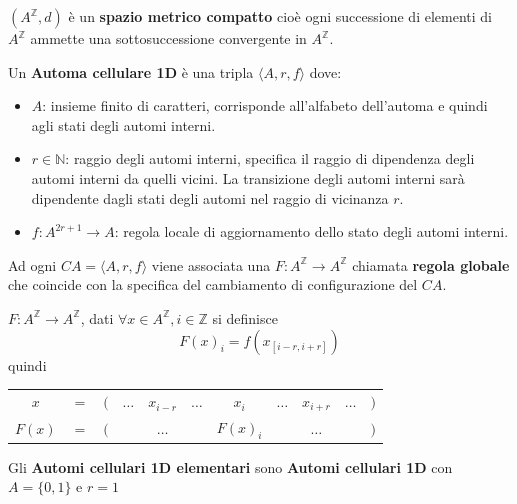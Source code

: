 \begin{nota} 
    $(A^\mathbb{Z}, d)$ è un \textbf{spazio metrico compatto} cioè ogni successione
    di elementi di $A^\mathbb{Z}$ ammette una sottosuccessione convergente in $A^\mathbb{Z}$.
\end{nota}
\begin{definizione} 
    Un \textbf{Automa cellulare 1D}  è una tripla $\langle A, r, f\rangle$
    dove:
    \begin{itemize}
        \item $A$: insieme finito di caratteri, corrisponde all'alfabeto dell'automa e
              quindi agli stati degli automi interni.
        \item $r\in \mathbb{N}$: raggio degli automi interni, specifica il raggio
              di dipendenza degli automi interni da quelli vicini. La transizione degli
              automi interni sarà dipendente dagli stati degli automi nel raggio
              di vicinanza $r$.
        \item $f: A^{2r+1}\rightarrow A$: regola locale di aggiornamento dello
              stato degli automi interni.
    \end{itemize}
\end{definizione}
Ad ogni $CA = \langle A, r, f\rangle$ viene associata una $F:A^\mathbb{Z}\rightarrow A^\mathbb{Z}$
chiamata \textbf{regola globale} che coincide con la specifica del cambiamento
di configurazione del $CA$.
\begin{definizione} 
    $F:A^\mathbb{Z}\rightarrow A^\mathbb{Z}$, dati $\forall x \in A^\mathbb{Z}, i \in \mathbb{Z}$
    si definisce
    $$F(x)_i = f(x_{[i-r, i+r]})$$
    quindi
    \begin{table}[!h]
        \centering
        \begin{tabular}{ccccccccccc}
            $x$    & $=$ & $($ & $\dots$                     & $x_{i-r}$ & $\dots$                     & $x_i$ & $\dots$ & $x_{i+r}$ & $\dots$ & $)$ \\
            $F(x)$ & $=$ & $($ & \multicolumn{3}{c}{$\dots$} & $F(x)_i$  & \multicolumn{3}{c}{$\dots$} & $)$
        \end{tabular}
    \end{table}
\end{definizione}
\begin{definizione} 
    Gli \textbf{Automi cellulari 1D elementari} sono \textbf{Automi cellulari 1D}
    con $A=\{0,1\}$ e $r=1$
\end{definizione}

